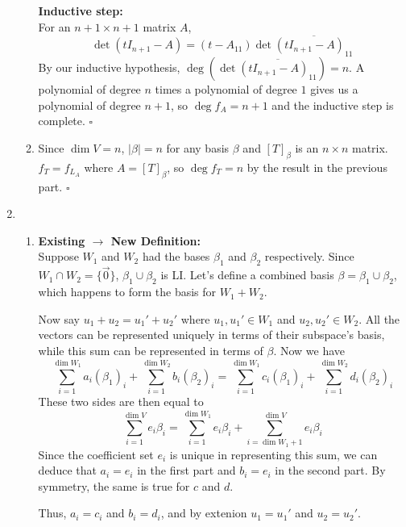 \documentclass[12pt]{article}
\begin{document}
\begin{enumerate}
\begin{enumerate}
                        \textbf{Inductive step:} \\
                        For an $n+1 \times n+1$ matrix $A$,
                        \[\det (tI_{n+1}-A)=(t-A_{11}) \det \overline{(tI_{n+1}-A)_{11}}\]
                        By our inductive hypothesis, $\deg (\det \overline{(tI_{n+1}-A)_{11}})=n$.
                        A polynomial of degree $n$ times a polynomial of degree $1$ gives us a polynomial of degree $n+1$,
                        so $\deg f_A=n+1$ and the inductive step is complete. $\square$
                  \item Since $\dim V=n$, $|\beta|=n$ for any basis $\beta$ and $[T]_\beta$ is an $n \times n$ matrix.
                        $f_T=f_{L_A}$ where $A=[T]_\beta$, so $\deg f_T=n$ by the result in the previous part. $\square$
            \end{enumerate}
      \item \begin{enumerate}
                  \item \textbf{Existing $\rightarrow$ New Definition:} \\
                        Suppose $W_1$ and $W_2$ had the bases $\beta_1$ and $\beta_2$ respectively.
                        Since $W_1 \cap W_2=\{\vec{0}\}$, $\beta_1 \cup \beta_2$ is LI.
                        Let's define a combined basis $\beta=\beta_1 \cup \beta_2$, which happens to form the basis for $W_1+W_2$.

                        Now say $u_1+u_2=u_1'+u_2'$ where $u_1, u_1' \in W_1$ and $u_2, u_2' \in W_2$.
                        All the vectors can be represented uniquely in terms of their subspace's basis,
                        while this sum can be represented in terms of $\beta$.
                        Now we have
                        \[\sum_{i=1}^{\dim W_1} a_i (\beta_{1})_i+\sum_{i=1}^{\dim W_2} b_i (\beta_{2})_i=\sum_{i=1}^{\dim W_1} c_i (\beta_{1})_i+\sum_{i=1}^{\dim W_2} d_i (\beta_{2})_i\]
                        These two sides are then equal to
                        \[\sum_{i=1}^{\dim V} e_i \beta_i=\sum_{i=1}^{\dim W_1} e_i \beta_i + \sum_{i=\dim W_1+1}^{\dim V} e_i \beta_i\]
                        Since the coefficient set $e_i$ is unique in representing this sum, we can deduce that $a_i=e_i$ in the first part and $b_i=e_i$ in the second part.
                        By symmetry, the same is true for $c$ and $d$.

                        Thus, $a_i=c_i$ and $b_i=d_i$, and by extenion $u_1=u_1'$ and $u_2=u_2'$.


\end{enumerate}
\end{enumerate}
\end{document}
